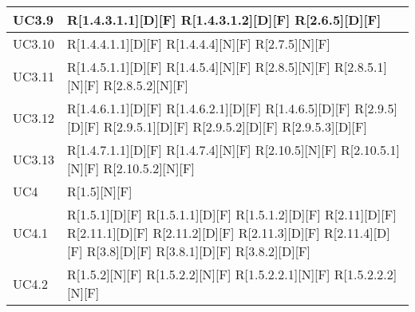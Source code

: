 \begin{longtable}{X | X}
\hline
UC3.9 & R[1.4.3.1.1][D][F] \newline
R[1.4.3.1.2][D][F] \newline
R[2.6.5][D][F]  \\
\hline
UC3.10 & R[1.4.4.1.1][D][F] \newline
R[1.4.4.4][N][F] \newline
R[2.7.5][N][F]  \\
\hline
UC3.11 & R[1.4.5.1.1][D][F] \newline
R[1.4.5.4][N][F] \newline
R[2.8.5][N][F] \newline
R[2.8.5.1][N][F] \newline
R[2.8.5.2][N][F]  \\
\hline
UC3.12 & R[1.4.6.1.1][D][F] \newline
R[1.4.6.2.1][D][F] \newline
R[1.4.6.5][D][F] \newline
R[2.9.5][D][F] \newline
R[2.9.5.1][D][F] \newline
R[2.9.5.2][D][F] \newline
R[2.9.5.3][D][F]  \\
\hline
UC3.13 & R[1.4.7.1.1][D][F] \newline
R[1.4.7.4][N][F] \newline
R[2.10.5][N][F] \newline
R[2.10.5.1][N][F] \newline
R[2.10.5.2][N][F]  \\
\hline
UC4 & R[1.5][N][F]  \\
\hline
UC4.1 & R[1.5.1][D][F] \newline
R[1.5.1.1][D][F] \newline
R[1.5.1.2][D][F] \newline
R[2.11][D][F] \newline
R[2.11.1][D][F] \newline
R[2.11.2][D][F] \newline
R[2.11.3][D][F] \newline
R[2.11.4][D][F] \newline
R[3.8][D][F] \newline
R[3.8.1][D][F] \newline
R[3.8.2][D][F]  \\
\hline
UC4.2 & R[1.5.2][N][F] \newline
R[1.5.2.2][N][F] \newline
R[1.5.2.2.1][N][F] \newline
R[1.5.2.2.2][N][F] \newline

\end{longtable}
